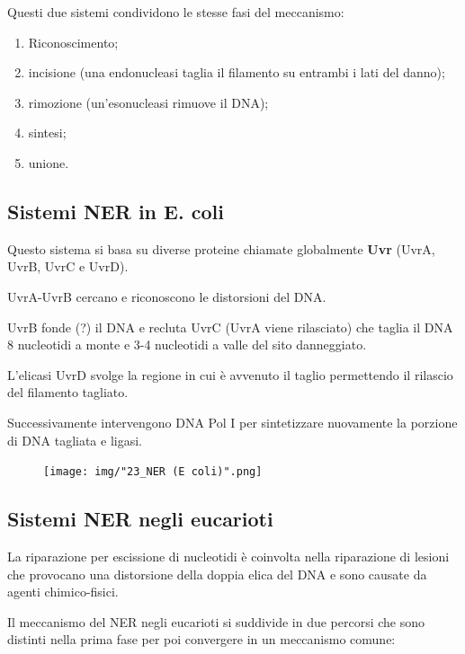\documentclass[11pt]{book}
\begin{document}
Questi due sistemi condividono le stesse fasi del meccanismo:

\begin{enumerate}
\def\labelenumi{\arabic{enumi}.}
\itemsep1pt\parskip0pt
\item
  Riconoscimento;
\item
  incisione (una endonucleasi taglia il filamento su entrambi i lati del
  danno);
\item
  rimozione (un'esonucleasi rimuove il DNA);
\item
  sintesi;
\item
  unione.
\end{enumerate}

\subsection{Sistemi NER in E. coli}\label{sistemi-ner-in-e.-coli}

Questo sistema si basa su diverse proteine chiamate globalmente
\textbf{Uvr} (UvrA, UvrB, UvrC e UvrD).

UvrA-UvrB cercano e riconoscono le distorsioni del DNA.

UvrB fonde (?) il DNA e recluta UvrC (UvrA viene rilasciato) che taglia
il DNA 8 nucleotidi a monte e 3-4 nucleotidi a valle del sito
danneggiato.

L'elicasi UvrD svolge la regione in cui è avvenuto il taglio permettendo
il rilascio del filamento tagliato.

Successivamente intervengono DNA Pol I per sintetizzare nuovamente la
porzione di DNA tagliata e ligasi.

\clearpage
\begin{figure}[htp]
\centering
\texttt{[image: img/"23\_NER (E coli)".png]}
\caption{}
\label{ner-e-coli}
\end{figure}


\subsection{Sistemi NER negli
eucarioti}\label{sistemi-ner-negli-eucarioti}

La riparazione per escissione di nucleotidi è coinvolta nella
riparazione di lesioni che provocano una distorsione della doppia elica
del DNA e sono causate da agenti chimico-fisici.

Il meccanismo del NER negli eucarioti si suddivide in due percorsi che
sono distinti nella prima fase per poi convergere in un meccanismo
comune:
\end{document}
